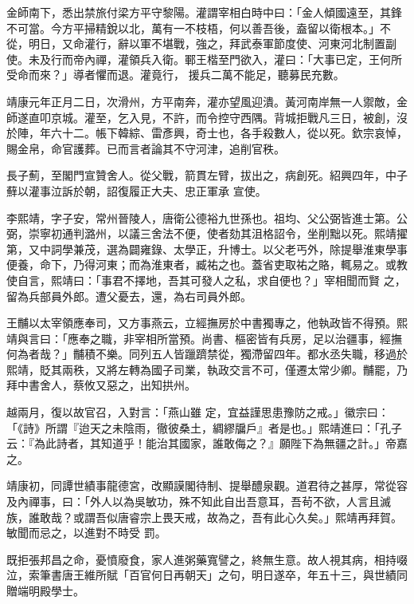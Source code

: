 \begin{pinyinscope}
 金師南下，悉出禁旅付梁方平守黎陽。灌謂宰相白時中曰：「金人傾國遠至，其鋒不可當。今方平掃精銳以北，萬有一不枝梧，何以善吾後，盍留以衛根本。」不從，明日，又命灌行，辭以軍不堪戰，強之，拜武泰軍節度使、河東河北制置副使。未及行而帝內禪，灌領兵入衛。鄆王楷至門欲入，灌曰：「大事已定，王何所受命而來？」導者懼而退。灌竟行，
 援兵二萬不能足，聽募民充數。



 靖康元年正月二日，次滑州，方平南奔，灌亦望風迎潰。黃河南岸無一人禦敵，金師遂直叩京城。灌至，乞入見，不許，而令控守西隅。背城拒戰凡三日，被創，沒於陣，年六十二。帳下韓綜、雷彥興，奇士也，各手殺數人，從以死。欽宗哀悼，賜金帛，命官護葬。已而言者論其不守河津，追削官秩。



 長子薊，至閣門宣贊舍人。從父戰，箭貫左臂，拔出之，病創死。紹興四年，中子蘚以灌事泣訴於朝，詔復履正大夫、忠正軍承
 宣使。



 李熙靖，字子安，常州晉陵人，唐衛公德裕九世孫也。祖均、父公弼皆進士第。公弼，崇寧初通判潞州，以議三舍法不便，使者劾其沮格詔令，坐削黜以死。熙靖擢第，又中詞學兼茂，選為闢雍錄、太學正，升博士。以父老丐外，除提舉淮東學事便養，命下，乃得河東；而為淮東者，臧祐之也。蓋省吏取祐之賂，輒易之。或教使自言，熙靖曰：「事君不擇地，吾其可發人之私，求自便也？」宰相聞而賢
 之，留為兵部員外郎。遭父憂去，還，為右司員外郎。



 王黼以太宰領應奉司，又方事燕云，立經撫房於中書獨專之，他執政皆不得預。熙靖與言曰：「應奉之職，非宰相所當預。尚書、樞密皆有兵房，足以治疆事，經撫何為者哉？」黼積不樂。同列五人皆躐躋禁從，獨滯留四年。都水丞失職，移過於熙靖，貶其兩秩，又將左轉為國子司業，執政交言不可，僅遷太常少卿。黼罷，乃拜中書舍人，蔡攸又惡之，出知拱州。



 越兩月，復以故官召，入對言：「燕山雖
 定，宜益謹思患豫防之戒。」徽宗曰：「《詩》所謂『迨天之未陰雨，徹彼桑土，綢繆牖戶』者是也。」熙靖進曰：「孔子云：『為此詩者，其知道乎！能治其國家，誰敢侮之？』願陛下為無疆之計。」帝嘉之。



 靖康初，同譚世績事龍德宮，改顯謨閣待制、提舉醴泉觀。道君待之甚厚，常從容及內禪事，曰：「外人以為吳敏功，殊不知此自出吾意耳，吾茍不欲，人言且滅族，誰敢哉？或謂吾似唐睿宗上畏天戒，故為之，吾有此心久矣。」熙靖再拜賀。敏聞而忌之，以進對不時受
 罰。



 既拒張邦昌之命，憂憤廢食，家人進粥藥寬譬之，終無生意。故人視其病，相持啜泣，索筆書唐王維所賦「百官何日再朝天」之句，明日遂卒，年五十三，與世績同贈端明殿學士。




\end{pinyinscope}
